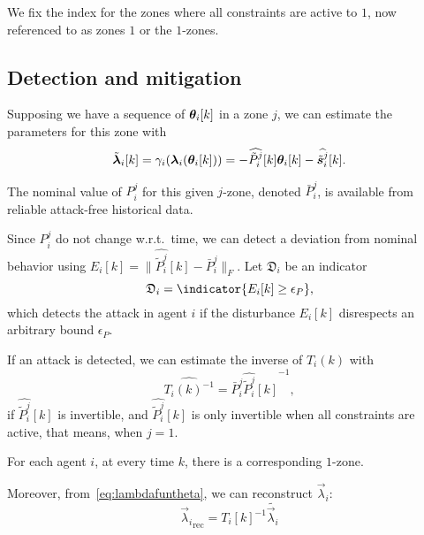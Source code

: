 \documentclass{ifacconf}  %
\begin{document}
We fix the index for the zones where all constraints are active to $1$, now referenced to as zones $1$ or the $1$-zones.

\subsection{Detection and mitigation}\label{ssec:DM}
Supposing we have a sequence of $\thetaik$ in a zone $j$, we can estimate the parameters for this zone with
\begin{equation}
  \label{eq:lambdafuntheta_tilde}
\lambdaicheat[k]=\gamma_{i}(\lambdai(\thetaik))=-\widehat{\tilde{P}_{i}^{j}}[k]\thetaik-\widehat{\tilde{\vec{s}}_{i}^{j}}[k].
\end{equation}

\begin{assumption}\label{ass:Pnominal}
  The nominal value of $P_{i}^{j}$ for this given $j$-zone, denoted $\bar{P}_{i}^{j}$, is available from reliable attack-free historical data.
\end{assumption}

Since $P_{i}^{j}$ do not change w.r.t.\ time, we can detect a deviation from nominal behavior using ${E_{i}[k] =\|\widehat{\tilde{P}_{i}^{j}}[k]-\bar{P}_{i}^{j}\|_{F}}$.
Let ${\mathfrak{D}_{i}}$ be an indicator
\begin{equation}
  \label{eq:2}
  \mathfrak{D}_{i}=\indicator{E_{i}[k]\geq\epsilon_{P}},
\end{equation}
which detects the attack in agent $i$
if the disturbance $E_{i}[k]$ disrespects an arbitrary bound $\epsilon_{P}$.

If an attack is detected, we can estimate the inverse of $T_{i}(k)$ with
\begin{equation}
\widehat{{T_{i}(k)}^{-1}}=\bar{P}_{i}^{j}{\widehat{\tilde{P}_{i}^{j}}[k]}^{-1},
\end{equation}
if $\widehat{\tilde{P}_{i}^{j}}[k]$ is invertible, and $\widehat{\tilde{P}_{i}^{j}}[k]$ is only invertible when all constraints are active, that means, when ${j=1}$.
\begin{assumption}
  For each agent $i$, at every time $k$, there is a corresponding $1$-zone.
\end{assumption}
Moreover, from~\eqref{eq:lambdafuntheta}, we can reconstruct $\vec{\lambda}_{i}$:
\begin{equation}
  \label{eq:lambda_reconstruction}
  {\vec{\lambda}_{i}}_{\mathrm{rec}}=\widehat{{T_{i}[k]}^{-1}} \tilde{\vec{\lambda}_{i}}
\end{equation}
\end{document}
